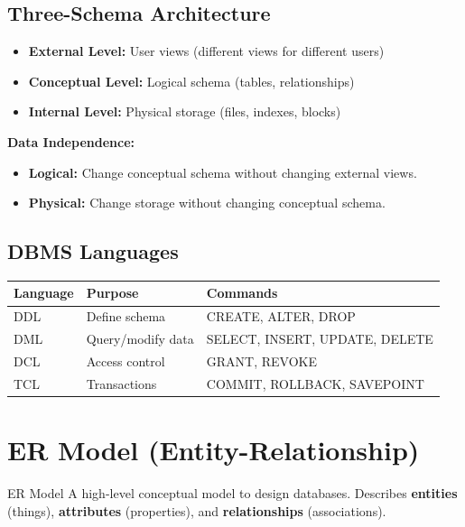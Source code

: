 \documentclass[12pt,a4paper]{article}
\begin{document}
\subsection{Three-Schema Architecture}
\begin{itemize}[leftmargin=*]
    \item \textbf{External Level:} User views (different views for different users)
    \item \textbf{Conceptual Level:} Logical schema (tables, relationships)
    \item \textbf{Internal Level:} Physical storage (files, indexes, blocks)
\end{itemize}

\textbf{Data Independence:}
\begin{itemize}[leftmargin=*]
    \item \textbf{Logical:} Change conceptual schema without changing external views.
    \item \textbf{Physical:} Change storage without changing conceptual schema.
\end{itemize}

\subsection{DBMS Languages}
\begin{center}
\begin{tabular}{@{}l l l@{}}
\toprule
\textbf{Language} & \textbf{Purpose} & \textbf{Commands} \\
\midrule
DDL & Define schema & CREATE, ALTER, DROP \\
DML & Query/modify data & SELECT, INSERT, UPDATE, DELETE \\
DCL & Access control & GRANT, REVOKE \\
TCL & Transactions & COMMIT, ROLLBACK, SAVEPOINT \\
\bottomrule
\end{tabular}
\end{center}

\section{ER Model (Entity-Relationship)}

\begin{conceptbox}{ER Model}
A high-level conceptual model to design databases. Describes \textbf{entities} (things), \textbf{attributes} (properties), and \textbf{relationships} (associations).
\end{conceptbox}
\end{document}
